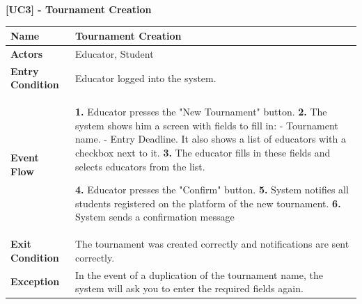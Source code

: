 \clearpage
\raggedright
\textbf{[UC3] - Tournament Creation}
\begin{table}[h]
\begin{tabular}{|l|p{12cm}|} \hline 

\rule[-3mm]{0mm}{1cm}
\textbf{Name} & Tournament Creation \\ \hline 

\rule[-3mm]{0mm}{1cm}
\textbf{Actors} & Educator, Student \\ \hline 

\rule[-3mm]{0mm}{1cm}
\textbf{Entry Condition} & Educator logged into the system.  \\ \hline 

\rule[-3mm]{0mm}{1cm}
\textbf{Event Flow} & 
\textbf{1.} Educator presses the "New Tournament" button.
\vspace{4pt}
\newline
\textbf{2.} The system shows him a screen with fields to fill in:
    \newline
    - Tournament name.
    \newline
    - Entry Deadline.
    \newline
    It also shows a list of educators with a checkbox next to it.
\vspace{4pt}
\newline
\textbf{3.} The educator fills in these fields and selects educators from the list.

\textbf{4.} Educator presses the "Confirm" button.
\vspace{4pt}
\newline
\textbf{5.} System notifies all students registered on the platform of the new tournament.
\vspace{4pt}
\newline
\textbf{6.} System sends a confirmation message

\\ \hline 

\rule[-3mm]{0mm}{1cm}
\textbf{Exit Condition} & The tournament was created correctly and notifications are sent correctly.  \\ \hline

\rule[-3mm]{0mm}{1cm}
\textbf{Exception} & In the event of a duplication of the tournament name, the system will ask you to enter the required fields again. \\ \hline

\end{tabular}
\end{table}


